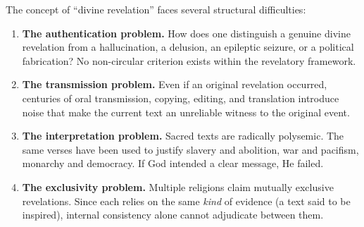 \documentclass[11pt,twoside]{article}
\begin{document}
\begin{scheda}

The concept of ``divine revelation'' faces several structural difficulties:

\begin{enumerate}
  \item \textbf{The authentication problem.}
    How does one distinguish a genuine divine revelation from a hallucination,
    a delusion, an epileptic seizure, or a
    political fabrication?  No non-circular criterion exists within the
    revelatory framework.
  \item \textbf{The transmission problem.}
    Even if an original revelation occurred, centuries of oral transmission,
    copying, editing, and translation introduce noise that make the current text an unreliable witness to the
    original event.
  \item \textbf{The interpretation problem.}
    Sacred texts are radically polysemic.  The same verses have been used to
    justify slavery and abolition, war and pacifism, monarchy
    and democracy.  If God intended a clear message, He failed.
  \item \textbf{The exclusivity problem.}
    Multiple religions claim mutually exclusive revelations.  Since each
    relies on the same \emph{kind} of evidence (a text said to be inspired),
    internal consistency alone cannot adjudicate between them.
\end{enumerate}
\end{scheda}
\end{document}
